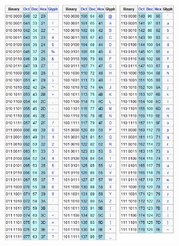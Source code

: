 \documentclass[handout]{beamer}
\begin{document}
\begin{frame}
\begin{columns}
\begin{column}{.33\textwidth}
\begin{center}
\begin{figure}
      \includegraphics[width=\columnwidth]{img/ascii2.jpg}
    \end{figure}
  \end{center}
\end{column}
\begin{column}{.33\textwidth}
  \begin{center}
    \begin{figure}

\end{figure}
\end{center}
\end{column}
\end{columns}
\end{frame}
\end{document}
